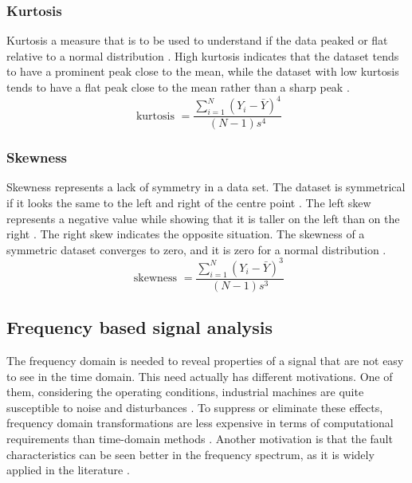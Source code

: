 \subsubsection{Kurtosis} 

Kurtosis a measure that is to be used to understand if the data peaked or flat relative to a normal distribution \cite{shukla2015analysis}. High kurtosis indicates that the dataset tends to have a prominent peak close to the mean, while the dataset with low kurtosis tends to have a flat peak close to the mean rather than a sharp peak \cite{croarkin2012handbook}.
\begin{equation}
\text { kurtosis }=\frac{\sum_{i=1}^{N}\left(Y_{i}-\bar{Y}\right)^{4}}{(N-1) s^{4}}
\label{kurtosis}
\end{equation}
\subsubsection{Skewness} 

Skewness represents a lack of symmetry in a data set. The dataset is symmetrical if it looks the same to the left and right of the centre point \cite{shukla2015analysis}. The left skew represents a negative value while showing that it is taller on the left than on the right \cite{croarkin2012handbook}. The right skew indicates the opposite situation. The skewness of a symmetric dataset converges to zero, and it is zero for a normal distribution \cite{croarkin2012handbook}.
\begin{equation}
\text { skewness }=\frac{\sum_{i=1}^{N}\left(Y_{i}-\bar{Y}\right)^{3}}{(N-1) s^{3}}
\label{skewness}
\end{equation}
\subsection{Frequency based signal analysis}

The frequency domain is needed to reveal properties of a signal that are not easy to see in the time domain. This need actually has different motivations. One of them, considering the operating conditions, industrial machines are quite susceptible to noise and disturbances \cite{cernuda2019relevance,allen2004signal}. To suppress or eliminate these effects, frequency domain transformations are less expensive in terms of computational requirements than time-domain methods \cite{ahmed2019condition,cernuda2019relevance}. Another motivation is that the fault characteristics can be seen better in the frequency spectrum, as it is widely applied in the literature \cite{ahmed2019condition}.

